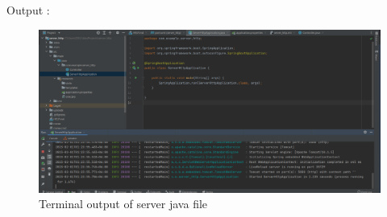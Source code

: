 \documentclass[11pt]{article}
\begin{document}
 Output : 
\begin{figure}[!h]
\centering
\includegraphics[width=\textwidth]{h_server.png}
\caption{Terminal output of server java file }
\end{figure}
\FloatBarrier

\pagebreak
\end{document}
